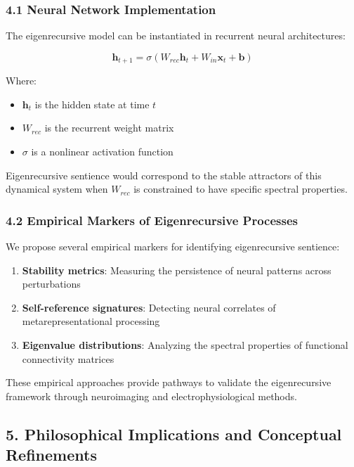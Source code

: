 \documentclass[
]{article}
\providecommand{\tightlist}{%
  \setlength{\itemsep}{0pt}\setlength{\parskip}{0pt}}
\begin{document}
\subsubsection{4.1 Neural Network
Implementation}\label{neural-network-implementation}

The eigenrecursive model can be instantiated in recurrent neural
architectures:

\[\mathbf{h}_{t+1} = \sigma(W_{rec}\mathbf{h}_t + W_{in}\mathbf{x}_t + \mathbf{b})\]

Where:

\begin{itemize}
\tightlist
\item
  \(\mathbf{h}_t\) is the hidden state at time \(t\)
\item
  \(W_{rec}\) is the recurrent weight matrix
\item
  \(\sigma\) is a nonlinear activation function
\end{itemize}

Eigenrecursive sentience would correspond to the stable attractors of
this dynamical system when \(W_{rec}\) is constrained to have specific
spectral properties.

\subsubsection{4.2 Empirical Markers of Eigenrecursive
Processes}\label{empirical-markers-of-eigenrecursive-processes}

We propose several empirical markers for identifying eigenrecursive
sentience:

\begin{enumerate}
\def\labelenumi{\arabic{enumi}.}
\tightlist
\item
  \textbf{Stability metrics}: Measuring the persistence of neural
  patterns across perturbations
\item
  \textbf{Self-reference signatures}: Detecting neural correlates of
  metarepresentational processing
\item
  \textbf{Eigenvalue distributions}: Analyzing the spectral properties
  of functional connectivity matrices
\end{enumerate}

These empirical approaches provide pathways to validate the
eigenrecursive framework through neuroimaging and electrophysiological
methods.

\subsection{5. Philosophical Implications and Conceptual
Refinements}\label{philosophical-implications-and-conceptual-refinements}
\end{document}
